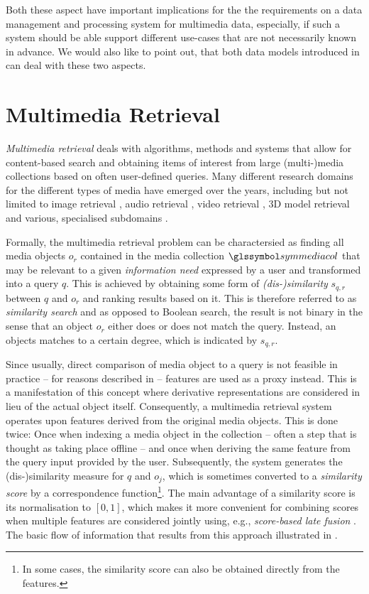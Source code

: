 Both these aspect have important implications for the the requirements on a data management and processing system for multimedia data, especially, if such a system should be able support different use-cases that are not necessarily known in advance. We would also like to point out, that both data models introduced in  can deal with these two aspects.

\section{Multimedia Retrieval}
\label{section:multimedia_retrieval}

\emph{Multimedia retrieval} deals with algorithms, methods and systems that allow for content-based search and obtaining items of interest from large (multi-)media collections based on often user-defined queries. Many different research domains for the different types of media have emerged over the years, including but not limited to image retrieval \cite{Dharani:2013Survey}, audio retrieval \cite{Lu:2001Indexing}, video retrieval \cite{Hu:2011Survey}, 3D model retrieval \cite{Yang:2007Content} and various, specialised subdomains \cite{Murthy:2018Content}.

Formally, the multimedia retrieval problem can be charactersied as finding all media objects $o_r$ contained in the media collection $\symmediacol$ that may be relevant to a given \emph{information need} expressed by a user and transformed into a query $q$. This is achieved by obtaining some form of \emph{(dis-)similarity} $s_{q,r}$ between $q$ and $o_r$ and ranking results based on it. This is therefore referred to as \emph{similarity search} and as opposed to Boolean search, the result is not binary in the sense that an object $o_r$ either does or does not match the query. Instead, an objects matches to a certain degree, which is indicated by $s_{q,r}$.

Since usually, direct comparison of media object to a query is not feasible in practice -- for reasons described in  -- features are used as a proxy instead. This is a manifestation of this concept where derivative representations are considered in lieu of the actual object itself. Consequently, a multimedia retrieval system operates upon features derived from the original media objects. This is done twice: Once when indexing a media object in the collection -- often a step that is thought as taking place offline -- and once when deriving the same feature from the query input provided by the user. Subsequently, the system generates the (dis-)similarity measure for $q$ and $o_j$, which is sometimes converted to a \emph{similarity score} by a correspondence function\footnote{In some cases, the similarity score can also be obtained directly from the features.}. The main advantage of a similarity score is its normalisation to $\left[ 0, 1 \right]$, which makes it more convenient for combining scores when multiple features are considered jointly using, e.g., \emph{score-based late fusion} \cite{Depeursinge:2010Fusion,Rossetto:2018thesis}.  The basic flow of information that results from this approach illustrated in . 


